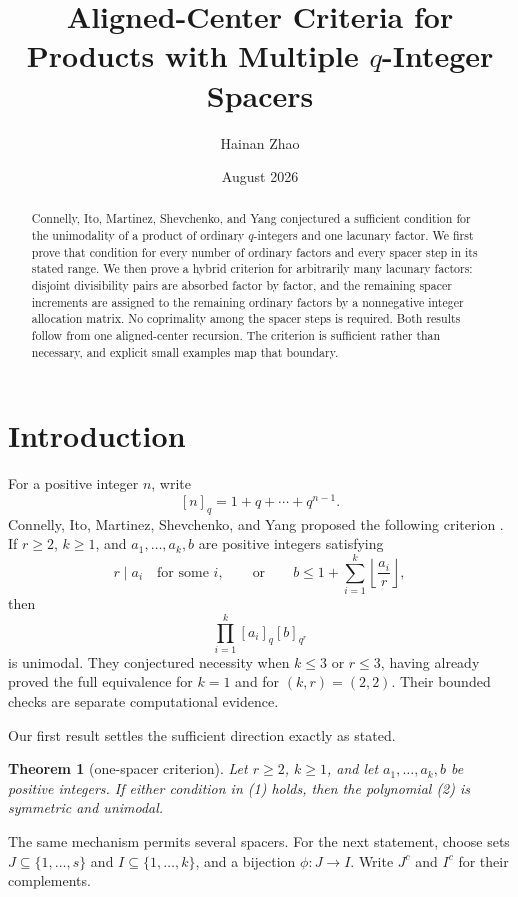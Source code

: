 \documentclass[11pt]{article}
\title{Aligned-Center Criteria for Products with Multiple
\(q\)-Integer Spacers}
\author{Hainan Zhao}
\date{August 2026}
\newtheorem{theorem}{Theorem}
\begin{document}
\maketitle

\begin{abstract}
Connelly, Ito, Martinez, Shevchenko, and Yang conjectured a sufficient
condition for the unimodality of a product of ordinary \(q\)-integers and
one lacunary factor.  We first prove that condition for every number of
ordinary factors and every spacer step in its stated range.  We then prove
a hybrid criterion for arbitrarily many lacunary factors: disjoint
divisibility pairs are absorbed factor by factor, and the remaining spacer
increments are assigned to the remaining ordinary factors by a nonnegative
integer allocation matrix.  No coprimality among the spacer steps is
required.  Both results follow from one aligned-center recursion.  The
criterion is sufficient rather than necessary, and explicit small examples
map that boundary.
\end{abstract}

\section{Introduction}

For a positive integer \(n\), write
\[
 [n]_q=1+q+\cdots+q^{n-1}.
\]
Connelly, Ito, Martinez, Shevchenko, and Yang proposed the following
criterion \cite[Conjecture~5.4]{CIMSY}.  If \(r\geq2\), \(k\geq1\), and
\(a_1,\ldots,a_k,b\) are positive integers satisfying
\[
 r\mid a_i\quad\text{for some }i,
 \qquad\text{or}\qquad
 b\leq1+\sum_{i=1}^k\left\lfloor\frac{a_i}{r}\right\rfloor,
 \tag{1}
\]
then
\[
 \prod_{i=1}^k[a_i]_q[b]_{q^r}                    \tag{2}
\]
is unimodal.  They conjectured necessity when \(k\leq3\) or \(r\leq3\),
having already proved the full equivalence for \(k=1\) and for
\((k,r)=(2,2)\).  Their bounded checks are separate computational evidence.

Our first result settles the sufficient direction exactly as stated.

\begin{theorem}[one-spacer criterion]\label{thm:one-spacer}
Let \(r\geq2\), \(k\geq1\), and let \(a_1,\ldots,a_k,b\) be positive
integers.  If either condition in \emph{(1)} holds, then the polynomial
\emph{(2)} is symmetric and unimodal.
\end{theorem}

The same mechanism permits several spacers.  For the next statement, choose
sets \(J\subseteq\{1,\ldots,s\}\) and
\(I\subseteq\{1,\ldots,k\}\), and a bijection
\(\phi:J\to I\).  Write \(J^c\) and \(I^c\) for their complements.
\end{document}
